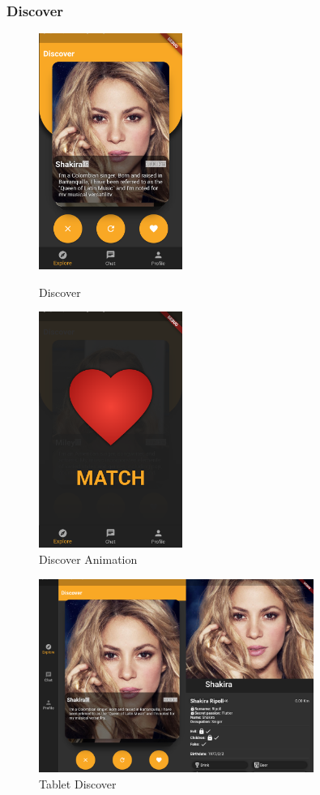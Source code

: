 \documentclass{article}
\begin{document}
\subsubsection{Discover}
\begin{figure}[!htb]
	\centering
	\begin{minipage}{.45\textwidth}
		\centering
		\includegraphics[height=7.7cm,keepaspectratio]{assets/images/ui/discover/03-discover-screen-match-animation.png}
		\caption{Discover}
	\end{minipage}\quad
	\begin{minipage}{.45\textwidth}
		\centering
		\includegraphics[height=7.7cm,keepaspectratio]{assets/images/ui/discover/06-discover-screen-match-animation.png	}
		\caption{Discover Animation}
	\end{minipage}
\end{figure}
\begin{figure}[!htb]
	\centering
	\includegraphics[width=0.8\textwidth]{assets/images/ui/discover/tabler-discover-screen.png}
	\caption{Tablet Discover}
\end{figure}
\end{document}

